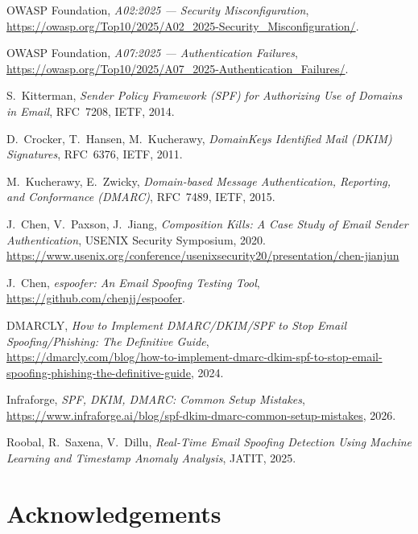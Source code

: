 \documentclass[11pt]{article}
\begin{document}
\begin{enumerate}[noitemsep, label={[\arabic*]}]
  \item OWASP Foundation, \emph{A02:2025 --- Security
        Misconfiguration},\\
        \url{https://owasp.org/Top10/2025/A02_2025-Security_Misconfiguration/}.
  \item OWASP Foundation, \emph{A07:2025 --- Authentication Failures},\\
        \url{https://owasp.org/Top10/2025/A07_2025-Authentication_Failures/}.
  \item S.\ Kitterman, \emph{Sender Policy Framework (SPF) for Authorizing Use of Domains in Email}, RFC~7208, IETF, 2014.
  \item D.\ Crocker, T.\ Hansen, M.\ Kucherawy, \emph{DomainKeys
        Identified Mail (DKIM) Signatures}, RFC~6376, IETF, 2011.
  \item M.\ Kucherawy, E.\ Zwicky, \emph{Domain-based Message
        Authentication, Reporting, and Conformance (DMARC)}, RFC~7489,
        IETF, 2015.
  \item J.\ Chen, V.\ Paxson, J.\ Jiang, \emph{Composition Kills: A
        Case Study of Email Sender Authentication}, USENIX Security
        Symposium, 2020.
        \url{https://www.usenix.org/conference/usenixsecurity20/presentation/chen-jianjun}
  \item J.\ Chen, \emph{espoofer: An Email Spoofing Testing Tool},\\
        \url{https://github.com/chenjj/espoofer}.
  \item DMARCLY, \emph{How to Implement DMARC/DKIM/SPF to Stop Email
        Spoofing/Phishing: The Definitive Guide},\\
        \url{https://dmarcly.com/blog/how-to-implement-dmarc-dkim-spf-to-stop-email-spoofing-phishing-the-definitive-guide}, 2024.
  \item Infraforge, \emph{SPF, DKIM, DMARC: Common Setup Mistakes},\\
        \url{https://www.infraforge.ai/blog/spf-dkim-dmarc-common-setup-mistakes}, 2026.
  \item Roobal, R.\ Saxena, V.\ Dillu, \emph{Real-Time Email Spoofing
        Detection Using Machine Learning and Timestamp Anomaly
        Analysis}, JATIT, 2025.
\end{enumerate}

\section{Acknowledgements}
\end{document}
